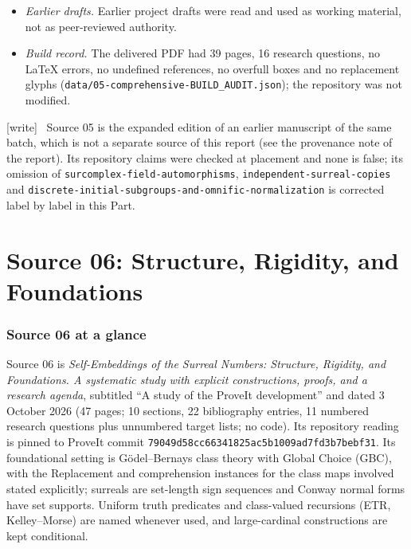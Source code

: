 \documentclass[11pt,a4paper]{article}
\numberwithin{equation}{section}
\theoremstyle{plain}
\theoremstyle{definition}
\theoremstyle{remark}
\newcommand{\code}[1]{\texttt{\small #1}}
\newcommand{\fn}[1]{\nolinkurl{#1}}%
\newcommand{\wtag}{\textup{\textsf{[write]}}}%
\newenvironment{wnote}{\par\smallskip\noindent\wtag\ }{\par\smallskip}
\begin{document}
\begin{itemize}
leading-term conventions and Questions~5.4 and~5.6; the experimental HTML,
with a different internal date, was not used as a separate version. The
primary PDF of \cite{vdDE} was consulted, including Proposition~4.7 on
printed page 183. Conway, Gonshor and Coste were not audited cover to cover;
Coste's archive access returned a bot challenge, so its o-minimal calculus
inputs are stated rather than freshly audited. Exact-phrase literature
searches are not evidence that a result has no antecedent.
\item \emph{Earlier drafts.} Earlier project drafts were read and used as
working material, not as peer-reviewed authority.
\item \emph{Build record.} The delivered PDF had 39 pages, 16 research
questions, no LaTeX errors, no undefined references, no overfull boxes and
no replacement glyphs (\fn{data/05-comprehensive-BUILD_AUDIT.json}); the
repository was not modified.
\end{itemize}
\begin{wnote}
Source 05 is the expanded edition of an earlier manuscript of the same batch,
which is not a separate source of this report (see the provenance note of
the report). Its repository claims were checked at placement and none is
false; its omission of \fn{surcomplex-field-automorphisms},
\fn{independent-surreal-copies} and
\fn{discrete-initial-subgroups-and-omnific-normalization} is corrected label by
label in this Part.
\end{wnote}
\part{Source 06: Structure, Rigidity, and Foundations}\label{sse:part:sr}

\section{Source 06 at a glance}\label{sse:sr:sec:glance}

Source 06 is \emph{Self-Embeddings of the Surreal Numbers: Structure,
Rigidity, and Foundations. A systematic study with explicit constructions,
proofs, and a research agenda}, subtitled ``A study of the ProveIt
development'' and dated 3 October 2026 (47 pages; 10 sections, 22
bibliography entries, 11 numbered research questions plus unnumbered target
lists; no code). Its repository reading is pinned to ProveIt commit
\code{79049d58cc66341825ac5b1009ad7fd3b7bebf31}. Its foundational setting is
G\"odel--Bernays class theory with Global Choice (GBC), with the Replacement
and comprehension instances for the class maps involved stated explicitly;
surreals are set-length sign sequences and Conway normal forms have set
supports. Uniform truth predicates and class-valued recursions (ETR,
Kelley--Morse) are named whenever used, and large-cardinal constructions are
kept conditional.
\end{document}
